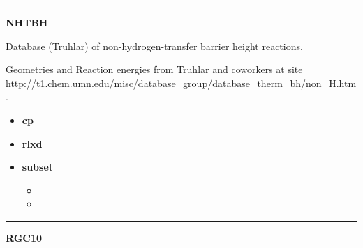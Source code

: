 \documentclass[letterpaper,10pt,english]{sphinxmanual}
\begin{document}
\bigskip\hrule{}\bigskip

\label{index:module-NHTBH}
\textbf{NHTBH}

\begin{DUlineblock}{0em}
\item[] Database (Truhlar) of non-hydrogen-transfer barrier height reactions.
\item[] Geometries and Reaction energies from Truhlar and coworkers at site \href{http://t1.chem.umn.edu/misc/database\_group/database\_therm\_bh/non\_H.htm}{http://t1.chem.umn.edu/misc/database\_group/database\_therm\_bh/non\_H.htm}.
\end{DUlineblock}
\begin{itemize}
\item {} 
\textbf{cp}  

\item {} 
\textbf{rlxd} 

\item {} 
\textbf{subset}
\begin{itemize}
\item {} 

\item {} 

\end{itemize}

\end{itemize}


\bigskip\hrule{}\bigskip

\label{index:module-RGC10}
\textbf{RGC10}
\end{document}
